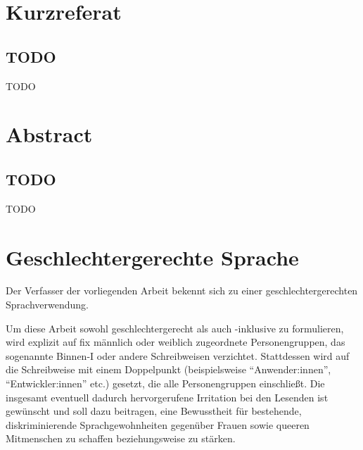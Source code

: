\documentclass[a4paper,12pt,twoside]{scrreprt}
\begin{document}
\newpage
\section*{Kurzreferat}
\label{sec:kurzreferat}

\subsection*{TODO}

TODO

\newpage
\section*{Abstract}
\label{sec:abstract}

\subsection*{TODO}

TODO

\newpage
\section*{Geschlechtergerechte Sprache}
\label{sec:gendern}

Der Verfasser der vorliegenden Arbeit bekennt sich zu einer geschlechtergerechten Sprachverwendung.

Um diese Arbeit sowohl geschlechtergerecht als auch -inklusive zu formulieren, wird explizit auf fix männlich oder weiblich zugeordnete Personengruppen, das sogenannte Binnen-I oder andere Schreibweisen verzichtet. Stattdessen wird auf die Schreibweise mit einem Doppelpunkt (beispielsweise \enquote{Anwender:innen}, \enquote{Entwickler:innen} etc.) gesetzt, die alle Personengruppen einschließt. Die insgesamt eventuell dadurch hervorgerufene
Irritation bei den Lesenden ist gewünscht und soll dazu beitragen, eine Bewusstheit für bestehende, diskriminierende Sprachgewohnheiten gegenüber Frauen sowie queeren Mitmenschen zu schaffen beziehungsweise zu stärken.

\cleardoublepage %
\setcounter{tocdepth}{2}
\tableofcontents

\clearpage
{}
{}
\listoffigures

\clearpage
{}
{}
\end{document}
